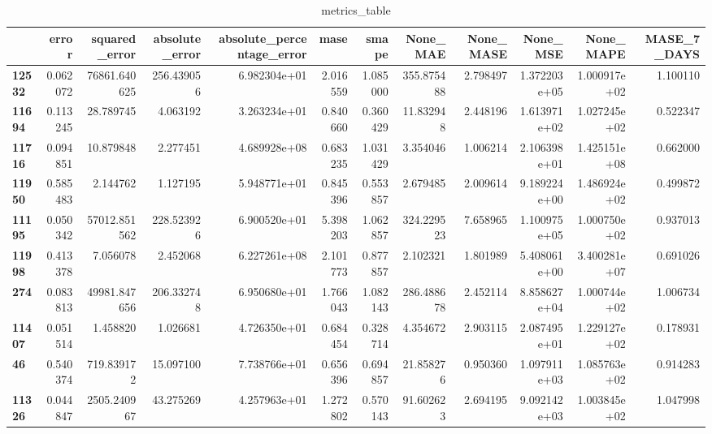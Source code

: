 \begin{table}[h]
\centering
\caption{metrics_table}
\label{table:Final tune for dataset 2 lstm local unviariate. After smape fix}
\begin{tabular}{lrrrrrrrrrrr}
\toprule
{} &     error &  squared\_error &  absolute\_error &  absolute\_percentage\_error &      mase &     smape &     None\_MAE &  None\_MASE &      None\_MSE &     None\_MAPE &  MASE\_7\_DAYS \\
\midrule
\textbf{12532} &  0.062072 &   76861.640625 &      256.439056 &               6.982304e+01 &  2.016559 &  1.085000 &   355.875488 &   2.798497 &  1.372203e+05 &  1.000917e+02 &     1.100110 \\
\textbf{11694} &  0.113245 &      28.789745 &        4.063192 &               3.263234e+01 &  0.840660 &  0.360429 &    11.832948 &   2.448196 &  1.613971e+02 &  1.027245e+02 &     0.522347 \\
\textbf{11716} &  0.094851 &      10.879848 &        2.277451 &               4.689928e+08 &  0.683235 &  1.031429 &     3.354046 &   1.006214 &  2.106398e+01 &  1.425151e+08 &     0.662000 \\
\textbf{11950} &  0.585483 &       2.144762 &        1.127195 &               5.948771e+01 &  0.845396 &  0.553857 &     2.679485 &   2.009614 &  9.189224e+00 &  1.486924e+02 &     0.499872 \\
\textbf{11195} &  0.050342 &   57012.851562 &      228.523926 &               6.900520e+01 &  5.398203 &  1.062857 &   324.229523 &   7.658965 &  1.100975e+05 &  1.000750e+02 &     0.937013 \\
\textbf{11998} &  0.413378 &       7.056078 &        2.452068 &               6.227261e+08 &  2.101773 &  0.877857 &     2.102321 &   1.801989 &  5.408061e+00 &  3.400281e+07 &     0.691026 \\
\textbf{274  } &  0.083813 &   49981.847656 &      206.332748 &               6.950680e+01 &  1.766043 &  1.082143 &   286.488678 &   2.452114 &  8.858627e+04 &  1.000744e+02 &     1.006734 \\
\textbf{11407} &  0.051514 &       1.458820 &        1.026681 &               4.726350e+01 &  0.684454 &  0.328714 &     4.354672 &   2.903115 &  2.087495e+01 &  1.229127e+02 &     0.178931 \\
\textbf{46   } &  0.540374 &     719.839172 &       15.097100 &               7.738766e+01 &  0.656396 &  0.694857 &    21.858276 &   0.950360 &  1.097911e+03 &  1.085763e+02 &     0.914283 \\
\textbf{11326} &  0.044847 &    2505.240967 &       43.275269 &               4.257963e+01 &  1.272802 &  0.570143 &    91.602623 &   2.694195 &  9.092142e+03 &  1.003845e+02 &     1.047998 \\

\end{tabular}
\end{table}
